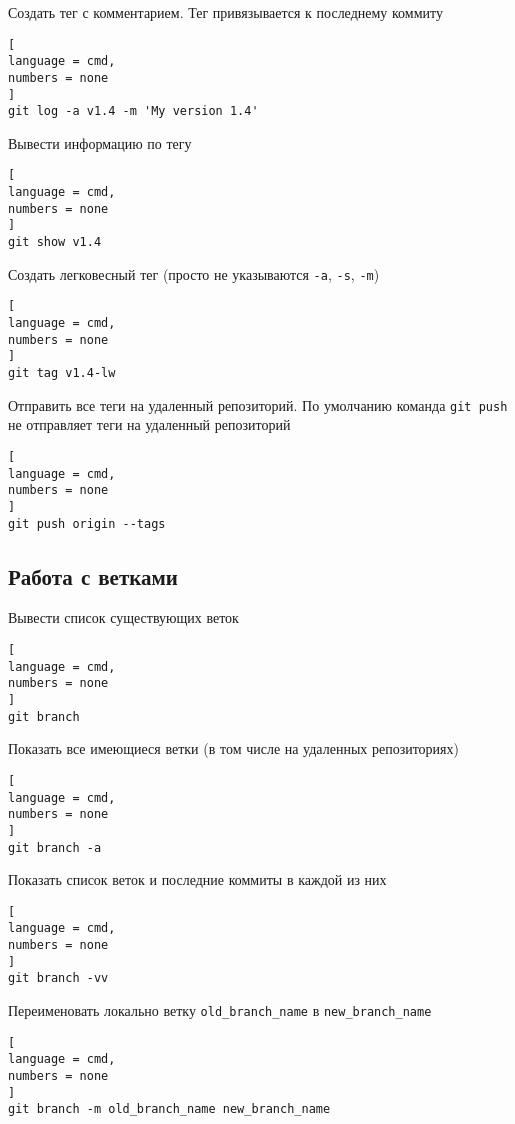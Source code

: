 \documentclass[%
	11pt,
	a4paper,
	utf8,
		]{article}
\begin{document}
Создать тег с комментарием. Тег привязывается к последнему коммиту

\begin{lstlisting}[
language = cmd,
numbers = none
]
git log -a v1.4 -m 'My version 1.4'
\end{lstlisting}

Вывести информацию по тегу

\begin{lstlisting}[
language = cmd,
numbers = none
]
git show v1.4
\end{lstlisting}


Создать легковесный тег (просто не указываются \texttt{-a}, \texttt{-s}, \texttt{-m})

\begin{lstlisting}[
language = cmd,
numbers = none
]
git tag v1.4-lw
\end{lstlisting}


Отправить все теги на удаленный репозиторий. По умолчанию команда \texttt{git push} не отправляет теги на удаленный репозиторий

\begin{lstlisting}[
language = cmd,
numbers = none
]
git push origin --tags
\end{lstlisting}


\subsection{Работа с ветками}

Вывести список существующих веток

\begin{lstlisting}[
language = cmd,
numbers = none
]
git branch
\end{lstlisting}

Показать все имеющиеся ветки (в том числе на удаленных репозиториях)
\begin{lstlisting}[
language = cmd,
numbers = none
]
git branch -a
\end{lstlisting}

Показать список веток и последние коммиты в каждой из них
\begin{lstlisting}[
language = cmd,
numbers = none
]
git branch -vv
\end{lstlisting}

Переименовать локально ветку \texttt{old\_branch\_name} в \texttt{new\_branch\_name}
\begin{lstlisting}[
language = cmd,
numbers = none
]
git branch -m old_branch_name new_branch_name
\end{lstlisting}
\end{document}
